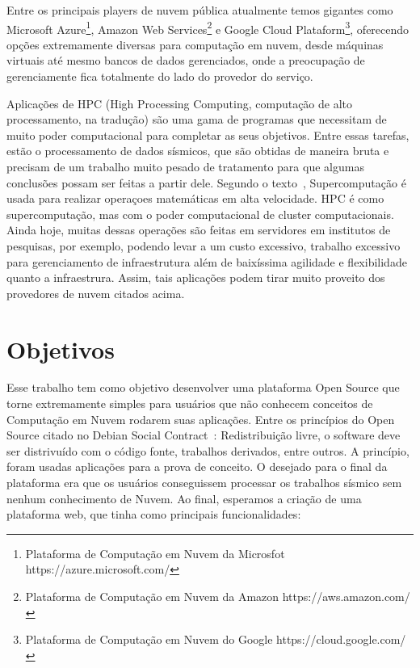 \documentclass[11pt,twoside]{article}
\begin{document}
Entre os principais players de nuvem pública atualmente temos gigantes como Microsoft Azure\footnote{Plataforma de Computação em Nuvem da Microsfot https://azure.microsoft.com/}, 
Amazon Web Services\footnote{Plataforma de Computação em Nuvem da Amazon https://aws.amazon.com/} e Google Cloud Plataform\footnote{Plataforma de Computação em Nuvem do Google https://cloud.google.com/}, 
oferecendo opções extremamente diversas para computação em nuvem, desde máquinas virtuais até mesmo bancos de dados gerenciados, onde a preocupação de gerenciamente fica totalmente
do lado do provedor do serviço.

Aplicações de HPC (High Processing Computing, computação de alto processamento, na tradução) são uma gama de programas que necessitam de muito poder computacional para 
completar as seus objetivos. Entre essas tarefas, estão o processamento de dados sísmicos, que são obtidas de maneira bruta e precisam de um trabalho muito pesado de tratamento
para que algumas conclusões possam ser feitas a partir dele. Segundo o texto~\cite{HPC}, Supercomputação é usada para realizar operaçoes matemáticas em alta velocidade. HPC é como supercomputação,
mas com o poder computacional de cluster computacionais.
Ainda hoje, muitas dessas operações são feitas em servidores em institutos de pesquisas, por exemplo, podendo levar
a um custo excessivo, trabalho excessivo para gerenciamento de infraestrutura além de baixíssima agilidade e flexibilidade quanto a infraestrura. Assim, tais aplicações podem 
tirar muito proveito dos provedores de nuvem citados acima.

\section{Objetivos}
Esse trabalho tem como objetivo desenvolver uma plataforma Open Source que torne extremamente simples para usuários que não conhecem conceitos de Computação em Nuvem rodarem suas aplicações.
Entre os princípios do Open Source citado no Debian Social Contract~\cite{BP}: Redistribuição livre, o software deve ser distrivuído com o código fonte, trabalhos derivados, entre outros.
A princípio, foram usadas aplicações para a prova de conceito. O desejado para o final da plataforma era que os usuários conseguissem processar os trabalhos sísmico sem nenhum conhecimento de Nuvem.  
Ao final, esperamos a criação de uma plataforma web, que tinha como principais funcionalidades:
\end{document}
